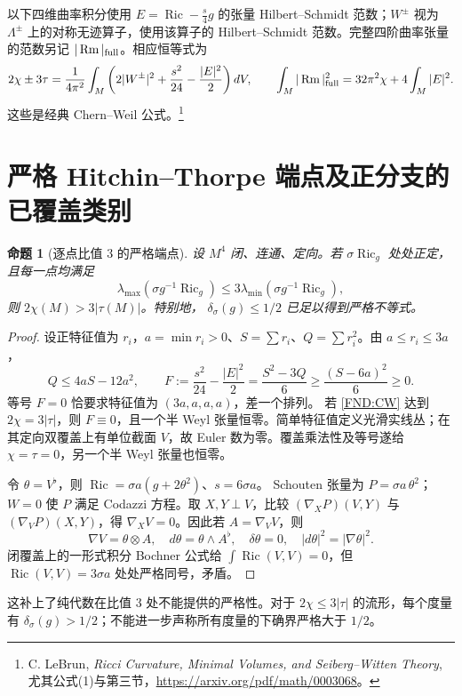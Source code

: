 \documentclass[UTF8,fontset=fandol,zihao=-4,oneside,openany]{ctexbook}
\theoremstyle{cjkplain}
\newtheorem{proposition}[theorem]{命题}
\numberwithin{equation}{chapter}
\DeclareMathOperator{\Ric}{Ric}
\DeclareMathOperator{\Rm}{Rm}
\begin{document}
以下四维曲率积分使用
\(E=\Ric-\frac{s}{4}g\) 的张量 Hilbert--Schmidt 范数；\(W^\pm\) 视为 \(\Lambda^\pm\) 上的对称无迹算子，使用该算子的 Hilbert--Schmidt 范数。完整四阶曲率张量的范数另记 \(|\Rm|_{\rm full}\)。相应恒等式为
\begin{equation}\label{FND:CW}
2\chi\pm3\tau=\frac1{4\pi^2}\int_M
\left(2|W^\pm|^2+\frac{s^2}{24}-\frac{|E|^2}{2}\right)dV,
\qquad
\int_M|\Rm|_{\rm full}^2=32\pi^2\chi+4\int_M|E|^2.
\end{equation}
这些是经典 Chern--Weil 公式。\footnote{C. LeBrun, \emph{Ricci Curvature, Minimal Volumes, and Seiberg--Witten Theory}, 尤其公式(1)与第三节，\url{https://arxiv.org/pdf/math/0003068}。}

\section{严格 Hitchin--Thorpe 端点及正分支的已覆盖类别}
\begin{proposition}[逐点比值 \(3\) 的严格端点]\label{FND:HT}
设 \(M^4\) 闭、连通、定向。若 \(\sigma\Ric_g\) 处处正定，且每一点均满足
\[
\lambda_{\max}(\sigma g^{-1}\Ric_g)
\le3\lambda_{\min}(\sigma g^{-1}\Ric_g),
\]
则 \(2\chi(M)>3|\tau(M)|\)。特别地，
\(\delta_\sigma(g)\le1/2\) 已足以得到严格不等式。
\end{proposition}
\begin{proof}
设正特征值为 \(r_i\)，\(a=\min r_i>0\)、\(S=\sum r_i\)、\(Q=\sum r_i^2\)。由 \(a\le r_i\le3a\)，
\[
Q\le4aS-12a^2,\qquad
F:=\frac{s^2}{24}-\frac{|E|^2}{2}
=\frac{S^2-3Q}{6}\ge\frac{(S-6a)^2}{6}\ge0.
\]
等号 \(F=0\) 恰要求特征值为 \((3a,a,a,a)\)，差一个排列。
若 \eqref{FND:CW} 达到 \(2\chi=3|\tau|\)，则 \(F\equiv0\)，且一个半 Weyl 张量恒零。简单特征值定义光滑实线丛；在其定向双覆盖上有单位截面 \(V\)，故 Euler 数为零。覆盖乘法性及等号遂给 \(\chi=\tau=0\)，另一个半 Weyl 张量也恒零。

令 \(\theta=V^\flat\)，则
\(\Ric=\sigma a(g+2\theta^2)\)、\(s=6\sigma a\)。
Schouten 张量为 \(P=\sigma a\,\theta^2\)；\(W=0\) 使 \(P\) 满足 Codazzi 方程。取 \(X,Y\perp V\)，比较
\((\nabla_XP)(V,Y)\) 与 \((\nabla_VP)(X,Y)\)，得
\(\nabla_XV=0\)。因此若 \(A=\nabla_VV\)，则
\[
\nabla V=\theta\otimes A,\quad
d\theta=\theta\wedge A^\flat,\quad
\delta\theta=0,\quad |d\theta|^2=|\nabla\theta|^2.
\]
闭覆盖上的一形式积分 Bochner 公式给
\(\int\Ric(V,V)=0\)，但 \(\Ric(V,V)=3\sigma a\) 处处严格同号，矛盾。
\end{proof}
这补上了纯代数在比值 \(3\) 处不能提供的严格性。对于
\(2\chi\le3|\tau|\) 的流形，每个度量有
\(\delta_\sigma(g)>1/2\)；不能进一步声称所有度量的下确界严格大于 \(1/2\)。
\end{document}
